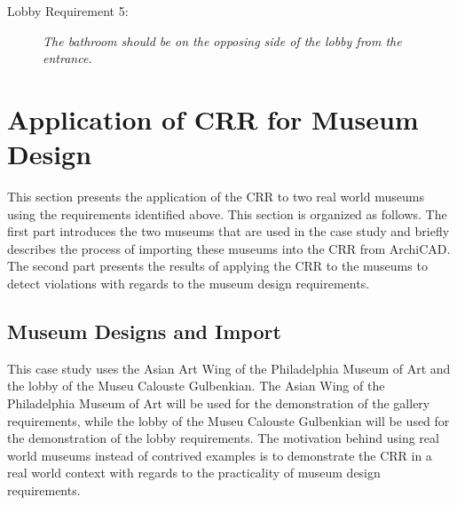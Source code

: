 \documentclass[12pt]{ucthesis}
\begin{document}
\begin{description}
\item[Lobby Requirement 5:] \emph{The bathroom should be on the opposing side of the lobby from the entrance.}
\end{description}


\section{Application of CRR for Museum Design}
This section presents the application of the CRR to two real world museums using the requirements identified above. This section is organized as follows. The first part introduces the two museums that are used in the case study and briefly describes the process of importing these museums into the CRR from ArchiCAD. The second part presents the results of applying the CRR to the museums to detect violations with regards to the museum design requirements. 



\subsection{Museum Designs and Import}
This case study uses the Asian Art Wing of the Philadelphia Museum of Art \cite{PhiladelphiaArtMuseum} and the lobby of the Museu Calouste Gulbenkian. The Asian Wing of the Philadelphia Museum of Art will be used for the demonstration of the gallery requirements, while the lobby of the Museu Calouste Gulbenkian will be used for the demonstration of the lobby requirements. The motivation behind using real world museums instead of contrived examples is to demonstrate the CRR in a real world context with regards to the practicality of museum design requirements.
\end{document}
